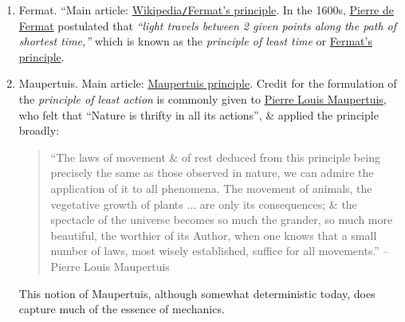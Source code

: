 \documentclass{article}
\begin{document}
\begin{enumerate}
	\item {\sc Fermat.} ``Main article: \href{https://en.wikipedia.org/wiki/Fermat%27s_principle}{Wikipedia{\tt/}Fermat's principle}. In the 1600s, \href{https://en.wikipedia.org/wiki/Pierre_de_Fermat}{Pierre de Fermat} postulated that \textit{``light travels between 2 given points along the path of shortest time,''} which is known as the \textit{principle of least time} or \href{https://en.wikipedia.org/wiki/Fermat%27s_principle}{Fermat's principle}.
	\item {\sc Maupertuis.} Main article: \href{https://en.wikipedia.org/wiki/Maupertuis_principle}{Maupertuis principle}. Credit for the formulation of the \textit{principle of least action} is commonly given to \href{https://en.wikipedia.org/wiki/Pierre_Louis_Maupertuis}{Pierre Louis Maupertuis}, who felt that ``Nature is thrifty in all its actions'', \& applied the principle broadly:
	\begin{quotation}
		``The laws of movement \& of rest deduced from this principle being precisely the same as those observed in nature, we can admire the application of it to all phenomena. The movement of animals, the vegetative growth of plants $\ldots$ are only its consequences; \& the spectacle of the universe becomes so much the grander, so much more beautiful, the worthier of its Author, when one knows that a small number of laws, most wisely established, suffice for all movements.'' -- Pierre Louis Maupertuis
	\end{quotation}
	This notion of Maupertuis, although somewhat deterministic today, does capture much of the essence of mechanics.
	

\end{enumerate}
\end{document}
